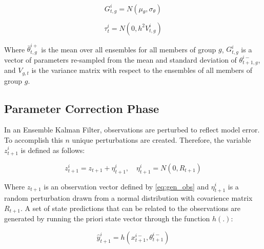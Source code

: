 
\begin{equation}\label{eq:hdekf_tau}
G_{t,g}^{i} = N( \mu_{\theta}, \sigma_{\theta} )
\end{equation}

\begin{equation}\label{eq:hdekf_tau}
\tau_{t}^{i} = N(0, h^{2}V_{t,g}^{i})
\end{equation}


Where $\bar{\theta}_{t,g}^{i+}$ is the mean over all ensembles for all members of group $g$, $G_{t,g}^{i}$ is a vector of parameters re-sampled from the mean and standard deviation of $\theta_{t+1,g}^{i-}$, and $V_{g,t}$ is the variance matrix with respect to the ensembles of all members of group $g$.

\subsection{Parameter Correction Phase}

In an Ensemble Kalman Filter, observations are perturbed to reflect model error. To accomplish this $n$ unique perturbations are created. Therefore, the variable $z_{t+1}^{i}$ is defined as follows:

\begin{equation}\label{eq:hdekf_obs}
z_{t+1}^{i} = z_{t+1} + \eta_{t+1}^{i},\quad \eta_{t+1}^{i} = N(0,R_{t+1})
\end{equation}

Where $z_{t+1}$ is an observation vector defined by \eqref{eq:gen_obs} and $\eta_{t+1}^{i}$ is a random perturbation drawn from a normal distribution with covarience matrix $R_{t+1}$. A set of state predictions that can be related to the observations are generated by running the priori state vector through the function $h(.)$:

\begin{equation}\label{eq:hdekf_pred}
\hat{y}_{t+1}^{i} = h(x_{t+1}^{i-}, \theta_{t+1}^{i-})
\end{equation}

